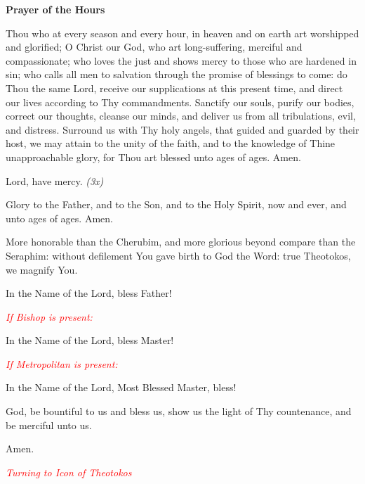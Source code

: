 \begin{center}
\textbf{Prayer of the Hours}
\end{center}

\begin{hang}
\noindent{}Thou who at every season and every hour, in heaven and on earth art worshipped and glorified; O Christ our God, who art long-suffering, merciful and compassionate; who loves the just and shows mercy to those who are hardened in sin; who calls all men to salvation through the promise of blessings to come: do Thou the same Lord, receive our supplications at this present time, and direct our lives according to Thy commandments. Sanctify our souls,  purify our bodies, correct our thoughts, cleanse our minds, and deliver us from all tribulations, evil, and distress. Surround us with Thy holy angels, that guided and guarded by their host, we may attain to the unity of the faith, and to the knowledge of Thine unapproachable glory, for Thou art blessed unto ages of ages. Amen.

Lord, have mercy. \textit{(3x)}

Glory to the Father, and to the Son, and to the Holy Spirit, now and ever, and unto ages of ages.  Amen.

More honorable than the Cherubim, and more glorious beyond compare than the Seraphim: without defilement You gave birth to God the Word: true Theotokos, we magnify You.

In the Name of the Lord, bless Father!

\textcolor{red}{\textit{If Bishop is present:}}

In the Name of the Lord, bless Master!

\textcolor{red}{\textit{If Metropolitan is present:}}

In the Name of the Lord, Most Blessed Master, bless!

\end{hang}

\begin{hang}
\noindent{}God, be bountiful to us and bless us, show us the light of Thy countenance, and be merciful unto us.

\end{hang}

\begin{hang}
\noindent{}Amen.

\end{hang}

\textcolor{red}{\textit{Turning to Icon of Theotokos}}

